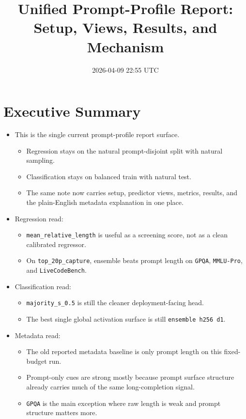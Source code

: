 \documentclass[11pt]{article}
\title{Unified Prompt-Profile Report:\\Setup, Views, Results, and Mechanism}
\author{}
\date{2026-04-09 22:55 UTC}
\begin{document}
\maketitle

\section*{Executive Summary}
\begin{itemize}[leftmargin=1.5em]
\item This is the single current prompt-profile report surface.
  \begin{itemize}[leftmargin=1.5em]
  \item Regression stays on the natural prompt-disjoint split with natural sampling.
  \item Classification stays on balanced train with natural test.
  \item The same note now carries setup, predictor views, metrics, results, and the plain-English metadata explanation in one place.
  \end{itemize}
\item Regression read:
  \begin{itemize}[leftmargin=1.5em]
  \item \texttt{mean\_relative\_length} is useful as a screening score, not as a clean calibrated regressor.
  \item On \texttt{top\_20p\_capture}, ensemble beats prompt length on \texttt{GPQA}, \texttt{MMLU-Pro}, and \texttt{LiveCodeBench}.
  \end{itemize}
\item Classification read:
  \begin{itemize}[leftmargin=1.5em]
  \item \texttt{majority\_s\_0.5} is still the cleaner deployment-facing head.
  \item The best single global activation surface is still \texttt{ensemble h256 d1}.
  \end{itemize}
\item Metadata read:
  \begin{itemize}[leftmargin=1.5em]
  \item The old reported metadata baseline is only prompt length on this fixed-budget run.
  \item Prompt-only cues are strong mostly because prompt surface structure already carries much of the same long-completion signal.
  \item \texttt{GPQA} is the main exception where raw length is weak and prompt structure matters more.
  \end{itemize}
\end{itemize}
\end{document}
